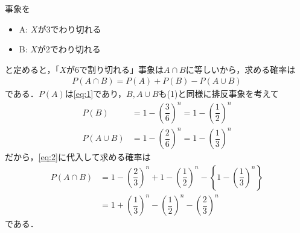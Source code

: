 \documentclass[../../main.tex]{subfiles}
\begin{document}
事象を
\begin{itemize}
  \item A: $X$が3でわり切れる \\
  \item B: $X$が2でわり切れる
\end{itemize}
と定めると，「$X$が6で割り切れる」事象は$A \cap B$に等しいから，求める確率は
\begin{align}
  P(A \cap B) = P(A) + P(B) - P(A \cup B) \label{eq:2}
\end{align}
である．$P(A)$は\cref{eq:1}であり，$B, A \cup B$も(1)と同様に排反事象を考えて
\begin{align}
  P(B) &= 1 - \left(\dfrac{3}{6}\right)^n = 1 - \left(\dfrac{1}{2}\right)^n \\
  P(A \cup B) &= 1 - \left(\dfrac{2}{6}\right)^n = 1 - \left(\dfrac{1}{3}\right)^n
\end{align}
だから，\cref{eq:2}に代入して求める確率は
\begin{align}
  P(A \cap B)
  &= 1 - \left(\dfrac{2}{3}\right)^n + 1 - \left(\dfrac{1}{2}\right)^n - \left\{1 - \left(\dfrac{1}{3}\right)^n\right\} \\
  &= 1 + \left(\dfrac{1}{3}\right)^n - \left(\dfrac{1}{2}\right)^n - \left(\dfrac{2}{3}\right)^n
\end{align}
である．
\end{document}
